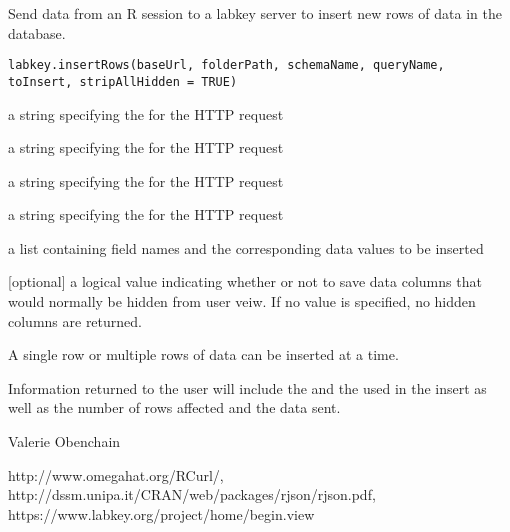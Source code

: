 \documentclass{article}
\begin{document}
\begin{Description}\relax
Send data from an R session to a labkey server to insert new rows of data in the database.
\end{Description}
\begin{Usage}
\begin{verbatim}
labkey.insertRows(baseUrl, folderPath, schemaName, queryName, toInsert, stripAllHidden = TRUE)
\end{verbatim}
\end{Usage}
\begin{Arguments}
\begin{ldescription}
\item[\code{baseUrl}] a string specifying the for the HTTP request
\item[\code{folderPath}] a string specifying the  for the HTTP request
\item[\code{schemaName}] a string specifying the   for the HTTP request
\item[\code{queryName}] a string specifying the   for the HTTP request
\item[\code{toInsert}] a list containing field names and the corresponding data values to be inserted
\item[\code{stripAllHidden}] [optional] a logical value indicating whether or not to save data columns that would 
normally be hidden from user veiw. If no value is specified, no hidden columns are returned.
\end{ldescription}
\end{Arguments}
\begin{Details}\relax
A single row or multiple rows of data can be inserted at a time.
\end{Details}
\begin{Value}
Information returned to the user will include the  and the  used in the insert
as well as the number of rows affected and the data sent.
\end{Value}
\begin{Author}\relax
Valerie Obenchain
\end{Author}
\begin{References}\relax
http://www.omegahat.org/RCurl/, 
http://dssm.unipa.it/CRAN/web/packages/rjson/rjson.pdf,
https://www.labkey.org/project/home/begin.view
\end{References}
\begin{SeeAlso}\relax
{}
\end{SeeAlso}
\end{document}
